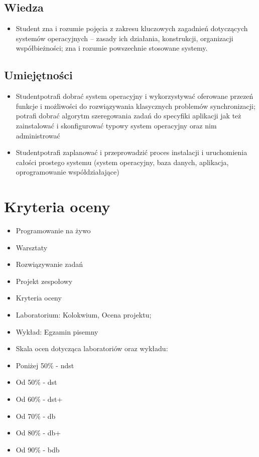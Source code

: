 \documentclass[12pt, a4paper]{article}
\begin{document}
\subsection*{Wiedza}
\begin{itemize}
  \item Student zna i rozumie pojęcia z zakresu kluczowych zagadnień dotyczących systemów operacyjnych – zasady ich działania, konstrukcji, organizacji współbieżności; zna i rozumie powszechnie stosowane systemy.
\end{itemize}

\subsection*{Umiejętności}
\begin{itemize}
  \item Studentpotrafi dobrać system operacyjny i wykorzystywać oferowane przezeń funkcje i możliwości do rozwiązywania klasycznych problemów synchronizacji; potrafi dobrać algorytm szeregowania zadań do specyfiki aplikacji jak też zainstalować i skonfigurować typowy system operacyjny oraz nim administrować
  \item Studentpotrafi zaplanować i przeprowadzić proces instalacji i uruchomienia całości prostego systemu (system operacyjny, baza danych, aplikacja, oprogramowanie współdziałające)
\end{itemize}

\section{Kryteria oceny}

\begin{itemize}
  \item Programowanie na żywo
  \item Warsztaty
  \item Rozwiązywanie zadań
  \item Projekt zespołowy
  \item Kryteria oceny
  \item Laboratorium: Kolokwium, Ocena projektu;
  \item Wykład: Egzamin pisemny
  \item Skala ocen dotycząca laboratoriów oraz wykładu:
  \item Poniżej 50\% - ndst
  \item Od 50\% - dst
  \item Od 60\% - dst+
  \item Od 70\% - db
  \item Od 80\% - db+
  \item Od 90\% - bdb
\end{itemize}
\end{document}
